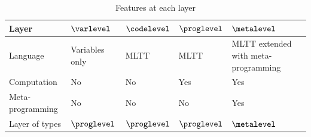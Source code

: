\begin{table}[]
\begin{tabular}{|l|l|l|l|l|}
\hline
Layer            & $\varlevel$ & $\codelevel$  & $\proglevel$  & $\metalevel$                          \\ \hline
Language         & Variables only &MLTT & MLTT & MLTT extended with meta-programming \\ \hline
Computation      & No & No   & Yes  & Yes                          \\ \hline
Meta-programming & No & No   & No  & Yes                          \\ \hline
Layer of types   & $\proglevel$ & $\proglevel$  & $\proglevel$  & $\metalevel$                          \\ \hline
\end{tabular}
\caption{Features at each layer}
\end{table}

